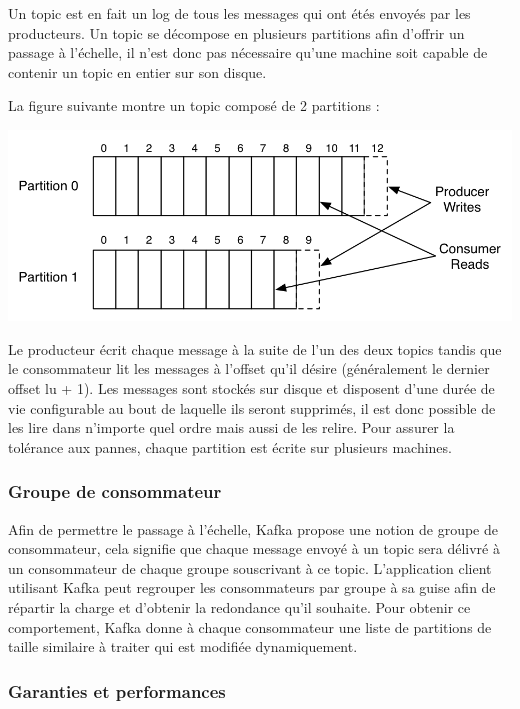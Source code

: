 \documentclass[a4paper, 11pt, titlepage]{article}
\begin{document}
Un topic est en fait un log de tous les messages qui ont étés envoyés par les producteurs. Un topic se décompose en plusieurs partitions afin d'offrir un passage à l'échelle, il n'est donc pas nécessaire qu'une machine soit capable de contenir un topic en entier sur son disque. 


La figure suivante montre un topic composé de 2 partitions :

\begin{center}
\includegraphics[scale=0.8]{res/topic_kafka.png}
\end{center}

Le producteur écrit chaque message à la suite de l'un des deux topics tandis que le consommateur lit les messages à l'offset qu'il désire (généralement le dernier offset lu + 1).
Les messages sont stockés sur disque et disposent d'une durée de vie configurable au bout de laquelle ils seront supprimés, il est donc possible de les lire dans n'importe quel ordre mais aussi de les relire.
Pour assurer la tolérance aux pannes, chaque partition est écrite sur plusieurs machines.


\subsubsection* {Groupe de consommateur}

Afin de permettre le passage à l'échelle, Kafka propose une notion de groupe de consommateur, cela signifie que chaque message envoyé à un topic sera délivré à un consommateur de chaque groupe souscrivant à ce topic. L'application client utilisant Kafka peut regrouper les consommateurs par groupe à sa guise afin de répartir la charge et d'obtenir la redondance qu'il souhaite. Pour obtenir ce comportement, Kafka donne à chaque consommateur une liste de partitions de taille similaire à traiter qui est modifiée dynamiquement.



\subsubsection* {Garanties et performances}
\end{document}
